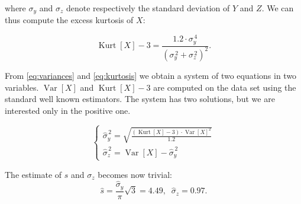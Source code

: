 where $\sigma_y$ and $\sigma_z$ denote respectively the standard deviation of $Y$ and $Z$. We can thus compute the excess kurtosis of $X$:

\begin{equation}
    \operatorname{Kurt}[X] - 3 = \frac{1.2 \cdot \sigma_{y}^{\,4}}{(\sigma_{y}^{\,2} + \sigma_{z}^{\,2})^2}.
    \label{eq:kurtosis}
\end{equation}

From \cref{eq:variances} and \cref{eq:kurtosis} we obtain a system of two equations in two variables.
$\operatorname{Var}[X]$ and $\operatorname{Kurt}[X] - 3$ are computed on the data set using the standard well known estimators.
The system has two solutions, but we are interested only in the positive one.

\begin{equation*}
    \begin{cases}
        \hat{\sigma}_y^{\,2} = \sqrt{\frac{(\operatorname{Kurt}[X] - 3) \cdot \operatorname{Var}[X]^2}{1.2}} \\
        \hat{\sigma}_z^{\,2} = \operatorname{Var}[X] - \hat{\sigma}_y^{\,2}
    \end{cases}
\end{equation*}

The estimate of $s$ and $\sigma_z$ becomes now trivial:
\begin{equation*}
    \hat{s} = \frac{\hat{\sigma}_y}{\pi} \sqrt{3} = 4.49, \;\; \hat{\sigma}_z = 0.97.
\end{equation*}
